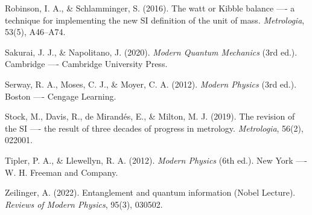 \begin{enumerate}[label={[\arabic*]}, leftmargin=1.2cm]
    \item Robinson, I. A., \& Schlamminger, S. (2016). The watt or Kibble balance ---- a technique for implementing the new SI definition of the unit of mass. \textit{Metrologia}, 53(5), A46--A74.
    \item Sakurai, J. J., \& Napolitano, J. (2020). \textit{Modern Quantum Mechanics} (3rd ed.). Cambridge ---- Cambridge University Press.
    \item Serway, R. A., Moses, C. J., \& Moyer, C. A. (2012). \textit{Modern Physics} (3rd ed.). Boston ---- Cengage Learning.
    \item Stock, M., Davis, R., de Mirand{\'e}s, E., \& Milton, M. J. (2019). The revision of the SI ---- the result of three decades of progress in metrology. \textit{Metrologia}, 56(2), 022001.
    \item Tipler, P. A., \& Llewellyn, R. A. (2012). \textit{Modern Physics} (6th ed.). New York ---- W. H. Freeman and Company.
    \item Zeilinger, A. (2022). Entanglement and quantum information (Nobel Lecture). \textit{Reviews of Modern Physics}, 95(3), 030502.
\end{enumerate}
